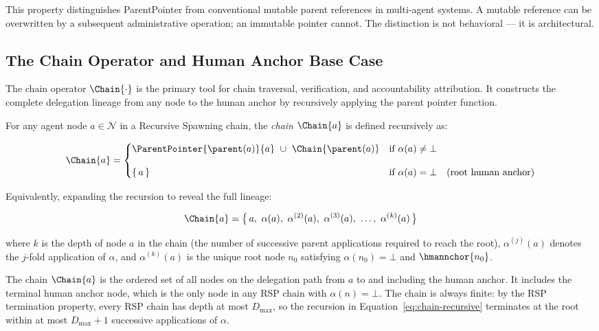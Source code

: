 This property distinguishes ParentPointer from conventional mutable parent references in multi-agent systems. A mutable reference can be overwritten by a subsequent administrative operation; an immutable pointer cannot. The distinction is not behavioral — it is architectural.

\subsection{The Chain Operator and Human Anchor Base Case}
\label{sec:chain-operator-definition}

The chain operator $\Chain{\cdot}$ is the primary tool for chain traversal, verification, and accountability attribution. It constructs the complete delegation lineage from any node to the human anchor by recursively applying the parent pointer function.

\begin{dfn}
\label{def:chain-operator}
For any agent node $a \in \mathcal{N}$ in a Recursive Spawning chain, the \emph{chain} $\Chain{a}$ is defined recursively as:

\begin{equation}
\Chain{a} =
\begin{cases}
\ParentPointer{\parent(a)}{a} \ \cup \ \Chain{\parent(a)} & \text{if } \alpha(a) \neq \bot \\[10pt]
\{\, a \,\} & \text{if } \alpha(a) = \bot \quad \text{(root human anchor)}
\end{cases}
\label{eq:chain-recursive}
\end{equation}

Equivalently, expanding the recursion to reveal the full lineage:

\begin{equation}
\Chain{a} = \bigl\{\, a,\ \alpha(a),\ \alpha^{(2)}(a),\ \alpha^{(3)}(a),\ \ldots,\ \alpha^{(k)}(a) \,\bigr\}
\label{eq:chain-expanded}
\end{equation}

where $k$ is the depth of node $a$ in the chain (the number of successive parent applications required to reach the root), $\alpha^{(j)}(a)$ denotes the $j$-fold application of $\alpha$, and $\alpha^{(k)}(a)$ is the unique root node $n_0$ satisfying $\alpha(n_0) = \bot$ and $\hmannchor{n_0}$.
\end{dfn}

The chain $\Chain{a}$ is the ordered set of all nodes on the delegation path from $a$ to and including the human anchor. It includes the terminal human anchor node, which is the only node in any RSP chain with $\alpha(n) = \bot$. The chain is always finite: by the RSP termination property, every RSP chain has depth at most $D_{\max}$, so the recursion in Equation~\ref{eq:chain-recursive} terminates at the root within at most $D_{\max} + 1$ successive applications of $\alpha$.

